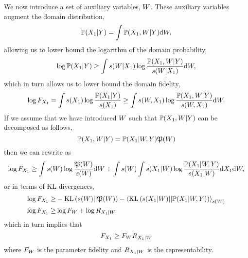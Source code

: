\documentclass[]{article}
\begin{document}
We now introduce a set of auxiliary variables, $W$. These auxiliary variables augment the domain distribution,
\[
\mathbb{P}({X_1} | Y) = \int \mathbb{P}({X_1}, W | Y) \text{d} W,
\]
allowing us to lower bound the logarithm of the domain probability,
\[
\log \mathbb{P}({X_1} | Y) \geq \int s(W|{X_1}) \log \frac{\mathbb{P}({X_1}, W | Y)}{s(W|{X_1})} \text{d}W,
\]
which in turn allows us to lower bound the domain fidelity, 
\[
\log F_{X_1} = \int s({X_1}) \log \frac{\mathbb{P}({X_1} | Y)}{s({X_1})} \geq \int s(W,{X_1}) \log \frac{\mathbb{P}({X_1}, W | Y)}{s(W,{X_1})} \text{d}W.
\]
If we assume that we have introduced $W$ such that $\mathbb{P}({X_1}, W| Y)$ can be decomposed as follows,
\[
\mathbb{P}({X_1}, W| Y) = \mathbb{P}({X_1}| W, Y) \mathfrak{P}(W)
\]
then we can rewrite as
\[
\log F_{X_1} \geq \int s(W) \log \frac{\mathfrak{P}(W)}{s(W)}\text{d} W + \int s(W) \int s({X_1}|W) \log \frac{\mathbb{P}({X_1}|W, Y)}{s({X_1}|W)} \text{d} {X_1} \text{d}W,
\]
or in terms of KL divergences,
\begin{align*}
\log F_{X_1} \geq & -\text{KL}\left(s(W)|| \mathfrak{P}(W)\right) - \left\langle  \text{KL}\left(s({X_1}|W) || \mathbb{P}({X_1}|W, Y) \right) \right\rangle_{ s(W)} \\
\log F_{X_1} \geq & \log F_W + \log R_{{X_1}|W}
\end{align*}
which in turn implies that
$$
F_{X_1} \geq F_W R_{{X_1}|W}
$$
where $F_W$ is the parameter fidelity and $R_{{X_1}|W}$ is the representability. 
\end{document}
